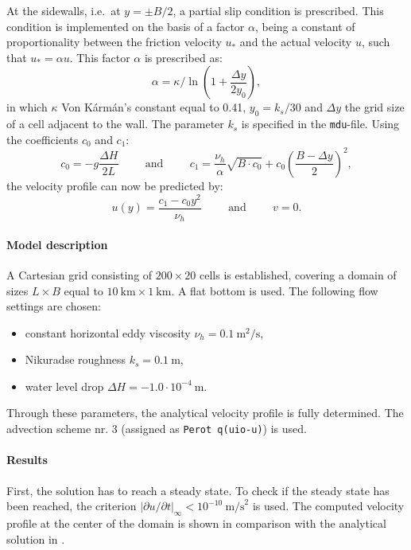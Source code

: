 At the sidewalls, i.e.\ at $y = \pm B/2$, a partial slip condition is prescribed. This condition is implemented on the basis of a factor $\alpha$, being a constant of proportionality between the friction velocity $u_*$ and the actual velocity $u$, such that $u_* = \alpha u$. This factor $\alpha$ is prescribed as:
\begin{equation}
\alpha = \kappa \Big/ \ln \left( 1+\frac{\Delta y}{2y_0} \right),
\end{equation}
in which $\kappa$ Von K\'arm\'an's constant equal to 0.41, $y_0 = k_s/30$ and $\Delta y$ the grid size of a cell adjacent to the wall. The parameter $k_s$ is specified in the \texttt{mdu}-file. Using the coefficients $c_0$ and $c_1$:
\begin{equation}
c_0  = -g\frac{\Delta H}{2L} \hspace{1cm} \textrm{and} \hspace{1cm} c_1 =
\frac{\nu_h}{\alpha}\sqrt{B \cdot c_0} + c_0 \left(\frac{B-\Delta y}{2} \right)^2,
\end{equation}
the velocity profile can now be predicted by:
\begin{equation}
u(y) = \frac{c_1 - c_0 y^2}{\nu_h} \hspace{1cm} \textrm{and} \hspace{1cm} v = 0.
\end{equation}


\paragraph*{Model description}
A Cartesian grid consisting of $200 \times 20$ cells is established, covering a domain of sizes $L \times B$ equal to $10~\textrm{km} \times 1~\textrm{km}$. A flat bottom is used. The following flow settings are chosen:
\begin{itemize}
\item constant horizontal eddy viscosity $\nu_h = 0.1~\textrm{m}^2/\textrm{s}$,
\item Nikuradse roughness $k_s = 0.1~\textrm{m}$,
\item water level drop $\Delta H = -1.0\cdot10^{-4}~\textrm{m}$.
\end{itemize}
Through these parameters, the analytical velocity profile is fully determined. The advection scheme nr. 3 (assigned as \texttt{Perot q(uio-u)}) is used.


\paragraph*{Results}
First, the solution has to reach a steady state. To check if the steady state has been reached, the criterion $|\partial u / \partial t |_{\infty} < 10^{-10}~\textrm{m/s}^2$ is used. The computed velocity profile at the center of the domain is shown in comparison with the analytical solution in .

